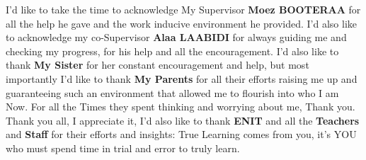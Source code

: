 \begin{acknowledgements}
 I'd like to take the time to acknowledge My Supervisor \textbf{Moez BOOTERAA} for all the help  he gave and the work inducive environment he provided. I'd also like to acknowledge my co-Supervisor \textbf{Alaa LAABIDI} for always guiding me and checking my progress, for his help  and all the encouragement. I'd also like to thank \textbf{My Sister} for her constant encouragement and help, but most importantly I'd like to thank \textbf{My Parents} for all their efforts raising me up and guaranteeing such an environment that allowed me to flourish into who I am Now. For all the Times they spent thinking and worrying about me, Thank you.\\	
 	Thank you all, I appreciate it, I'd also like to thank \textbf{ENIT} and all the \textbf{Teachers} and \textbf{Staff} for their efforts and insights: True Learning comes from you, it's YOU who must spend time in trial and error to truly learn.%
\end{acknowledgements}